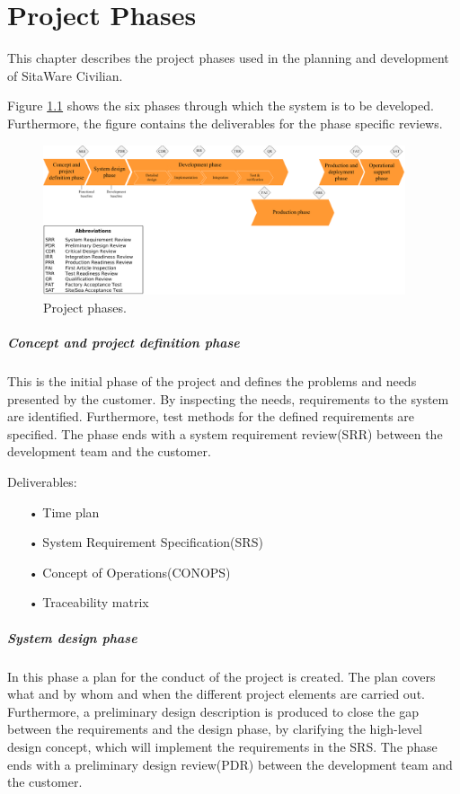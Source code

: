 \chapter{Project Phases}

This chapter describes the project phases used in the planning and development of SitaWare Civilian.

Figure \ref{fig:project_phases} shows the six phases through which the system is to be developed. Furthermore, the figure contains the deliverables for the phase specific reviews. 

\begin{figure}[H]
\centering
\includegraphics[width=0.95\textwidth]
{Billeder/project_phases/project_phases.PNG}
\caption{Project phases.}
\label{fig:project_phases}
\end{figure}


\paragraph{Concept and project definition phase}
This is the initial phase of the project and defines the problems and needs presented by the customer. By inspecting the needs, requirements to the system are identified. Furthermore, test methods for the defined requirements are specified. The phase ends with a system requirement review(SRR) between the development team and the customer. 

Deliverables:
\begin{enumerate}
\item[•] Time plan
\item[•] System Requirement Specification(SRS)
\item[•] Concept of Operations(CONOPS)
\item[•] Traceability matrix
\end{enumerate}


\paragraph{System design phase}
In this phase a plan for the conduct of the project is created. The plan covers what and by whom and when the different project elements are carried out. Furthermore, a preliminary design description is produced to close the gap between the requirements and the design phase, by clarifying the high-level design concept, which will implement the requirements in the SRS. The phase ends with a preliminary design review(PDR) between the development team and the customer. 

